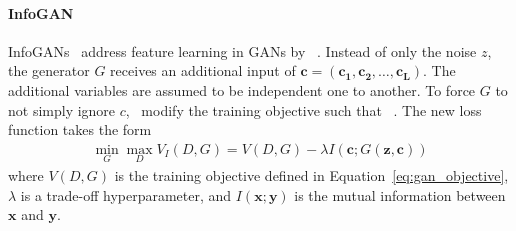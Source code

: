 \paragraph{InfoGAN}
InfoGANs~\cite{chen2016infogan} address feature learning in \acp{GAN} by ~\citep{chen2016infogan}.
Instead of only the noise $z$, the generator $G$ receives an additional input of  $\bm{c} = (\bm{c_1}, \bm{c_2}, \dots, \bm{c_L})$.
The additional variables are assumed to be independent one to another.
To force $G$ to not simply ignore $c$,~\citet{chen2016infogan} modify the training objective such that ~\citep{chen2016infogan}.
The new loss function takes the form
\begin{align}
    \min _{G} \max _{D} V_I(D, G)=V(D, G) - \lambda I(\bm{c}; G(\bm{z}, \bm{c}))
\end{align}
where $V(D, G)$ is the training objective defined in Equation~\ref{eq:gan_objective}, $\lambda$ is a trade-off hyperparameter, and $I(\bm{x}; \bm{y})$ is the mutual information between $\bm{x}$ and $\bm{y}$.

